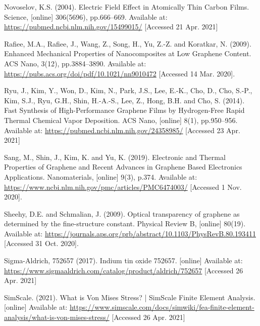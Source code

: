 \documentclass[a4paper,12pt]{article}
\numberwithin{equation}{section}
\numberwithin{figure}{section}
\begin{document}
\noindent Novoselov, K.S. (2004). Electric Field Effect in Atomically Thin Carbon Films. Science, [online] 306(5696), pp.666–669. Available at: \url{https://pubmed.ncbi.nlm.nih.gov/15499015/} [Accessed 21 Apr. 2021]\vspace{\baselineskip}

\noindent Rafiee, M.A., Rafiee, J., Wang, Z., Song, H., Yu, Z.-Z. and Koratkar, N. (2009). Enhanced Mechanical Properties of Nanocomposites at Low Graphene Content. ACS Nano, 3(12), pp.3884–3890. Available at: \url{https://pubs.acs.org/doi/pdf/10.1021/nn9010472} [Accessed 14 Mar. 2020].\vspace{\baselineskip}

\noindent Ryu, J., Kim, Y., Won, D., Kim, N., Park, J.S., Lee, E.-K., Cho, D., Cho, S.-P., Kim, S.J., Ryu, G.H., Shin, H.-A.-S., Lee, Z., Hong, B.H. and Cho, S. (2014). Fast Synthesis of High-Performance Graphene Films by Hydrogen-Free Rapid Thermal Chemical Vapor Deposition. ACS Nano, [online] 8(1), pp.950–956. Available at: \url{https://pubmed.ncbi.nlm.nih.gov/24358985/} [Accessed 23 Apr. 2021]\vspace{\baselineskip}

\noindent Sang, M., Shin, J., Kim, K. and Yu, K. (2019). Electronic and Thermal Properties of Graphene and Recent Advances in Graphene Based Electronics Applications. Nanomaterials, [online] 9(3), p.374. Available at: \url{https://www.ncbi.nlm.nih.gov/pmc/articles/PMC6474003/} [Accessed 1 Nov. 2020].\vspace{\baselineskip}

\noindent Sheehy, D.E. and Schmalian, J. (2009). Optical transparency of graphene as determined by the fine-structure constant. Physical Review B, [online] 80(19). Available at: \url{https://journals.aps.org/prb/abstract/10.1103/PhysRevB.80.193411} [Accessed 31 Oct. 2020].\vspace{\baselineskip}

\noindent Sigma-Aldrich, 752657 (2017). Indium tin oxide 752657. [online] Available at: \url{https://www.sigmaaldrich.com/catalog/product/aldrich/752657} [Accessed 26 Apr. 2021]\vspace{\baselineskip}

\noindent SimScale. (2021). What is Von Mises Stress? | SimScale Finite Element Analysis. [online] Available at: \url{https://www.simscale.com/docs/simwiki/fea-finite-element-analysis/what-is-von-mises-stress/} [Accessed 26 Apr. 2021]\vspace{\baselineskip}
\end{document}
